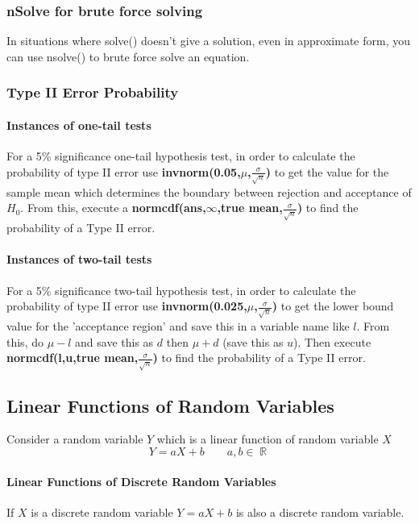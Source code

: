 \documentclass[a4paper,twoside,10pt]{article}
\DeclareMathOperator\R{\mathbb{R}}
\begin{document}
			\subsubsection{nSolve for brute force solving}
				In situations where solve() doesn't give a solution, even in approximate form, you can use nsolve() to brute force solve an equation.
				
			\subsubsection{Type II Error Probability}
				\paragraph{Instances of one-tail tests} For a 5\% significance one-tail hypothesis test, in order to calculate the probability of type II error use \textbf{invnorm(0.05,$\mu$,$\frac{\sigma}{\sqrt{n}}$)} to get the value for the sample mean which determines the boundary between rejection and acceptance of $H_0$. From this, execute a \textbf{normcdf(ans,$\infty$,true mean,$\frac{\sigma}{\sqrt{n}}$)} to find the probability of a Type II error.
				
				\paragraph{Instances of two-tail tests} For a 5\% significance two-tail hypothesis test, in order to calculate the probability of type II error use \textbf{invnorm(0.025,$\mu$,$\frac{\sigma}{\sqrt{n}}$)} to get the lower bound value for the 'acceptance region' and save this in a variable name like $l$. From this, do $\mu-l$ and save this as $d$ then $\mu+d$ (save this as $u$). Then execute \textbf{normcdf(l,u,true mean,$\frac{\sigma}{\sqrt{n}}$)} to find the probability of a Type II error.
			
		\subsection{Linear Functions of Random Variables}
			Consider a random variable $Y$ which is a linear function of random variable $X$
			\[
				Y=aX+b\qquad a,b\in\R
			\]
			
			\paragraph{Linear Functions of Discrete Random Variables} If $X$ is a discrete random variable $Y=aX+b$ is also a discrete random variable.
			
\end{document}
